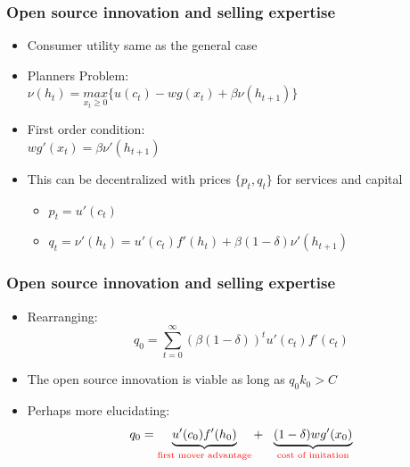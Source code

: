 \documentclass{beamer}
\begin{document}
\begin{frame}[t]\frametitle{Open source innovation and selling expertise}
  \begin{itemize}
	  \vspace{2mm}
    \item<+-> Consumer utility same as the general case
	\vspace{2mm}
    \item<+-> Planners Problem:\\ 
    \hspace{10mm}$\nu(h_t) = \underset{x_t \ge 0}{max} \{u(c_t) - wg(x_t) + \beta\nu(h_{t+1})\}$
	\vspace{2mm}
    \item<+-> First order condition:\\
    \hspace{15mm}$wg'(x_t) = \beta\nu'(h_{t+1})$
	\vspace{2mm}
    \item<+-> This can be decentralized with prices $\{p_t, q_t\}$ for services and capital
    \begin{itemize}
		\vspace{2mm}
    \item<+-> $p_t = u'(c_t)$
	\vspace{2mm}
    \item<+-> $q_t = \nu'(h_t) = u'(c_t)f'(h_t) + \beta(1-\delta)\nu'(h_{t+1})$ 
    \end{itemize} 
  \end{itemize}
\end{frame}

\begin{frame}[t]\frametitle{Open source innovation and selling expertise}
  \begin{itemize}
	  \vspace{2mm}
    \item<+-> Rearranging:
    \begin{equation*}
       q_0 = \sum_{t=0}^\infty(\beta(1-\delta))^tu'(c_t)f'(c_t)
    \end{equation*}
	\vspace{2mm}
     \item<+-> The open source innovation is viable as long as $q_0k_0 > C$
	 \vspace{2mm}
     \item<+-> Perhaps more elucidating:\\
	 \begin{equation*}
     q_0 = \underbrace{u'(c_0)f'(h_0)}_{\text{\color{red}first mover advantage}} +\ \ \underbrace{(1-\delta)wg'(x_0)}_{\text{\color{red}cost of imitation}} 
	 \end{equation*} 
  \end{itemize}
\end{frame}
\end{document}
